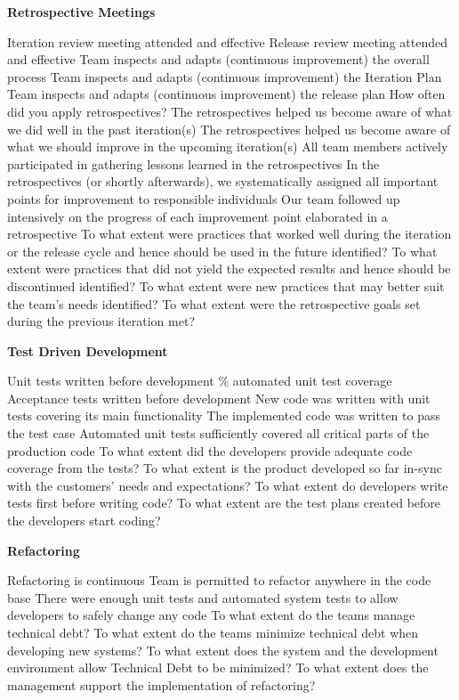 \textbf{Retrospective Meetings}
\begin{itemize}
	\taa Iteration review meeting attended and effective
	\taa Release review meeting attended and effective
	\taar Team inspects and adapts (continuous improvement) the overall process
	\taar Team inspects and adapts (continuous improvement) the Iteration Plan
	\taar Team inspects and adapts (continuous improvement) the release plan
	\pamr How often did you apply retrospectives? %
	\pamr The retrospectives helped us become aware of what we did well in the past iteration(s)
	\pamr The retrospectives helped us become aware of what we should improve in the upcoming iteration(s)
	\pamr All team members actively participated in gathering lessons learned in the retrospectives
	\pamr In the retrospectives (or shortly afterwards), we systematically assigned all important points for improvement to responsible individuals
	\pamr Our team followed up intensively on the progress of each improvement point elaborated in a retrospective
	\ops To what extent were practices that worked well during the iteration or the release cycle and hence should be used in the future identified?
	\ops To what extent were practices that did not yield the expected results and hence should be discontinued identified?
	\ops To what extent were new practices that may better suit the team's needs identified?
	\ops To what extent were the retrospective goals set during the previous iteration met? 
\end{itemize}

\textbf{Test Driven Development}
\begin{itemize}
	\taa Unit tests written before development
	\% automated unit test coverage
	\taar Acceptance tests written before development
	\pam New code was written with unit tests covering its main functionality
	\pam The implemented code was written to pass the test case
	\pamr Automated unit tests sufficiently covered all critical parts of the production code
	\ops To what extent did the developers provide adequate code coverage from the tests?
	\ops To what extent is the product developed so far in-sync with the customers' needs and expectations?
	\ops To what extent do developers write tests first before writing code?
	\ops To what extent are the test plans created before the developers start coding? 
\end{itemize}

\textbf{Refactoring}
\begin{itemize}
	\taa Refactoring is continuous
	\taar Team is permitted to refactor anywhere in the code base
	\pamr There were enough unit tests and automated system tests to allow developers to safely change any code
	\ops To what extent do the teams manage technical debt? 
	\ops To what extent do the teams minimize technical debt when developing new systems? 
	\ops To what extent does the system and the development environment allow Technical Debt to be minimized? 
	\ops To what extent does the management support the implementation of refactoring? 
\end{itemize}

